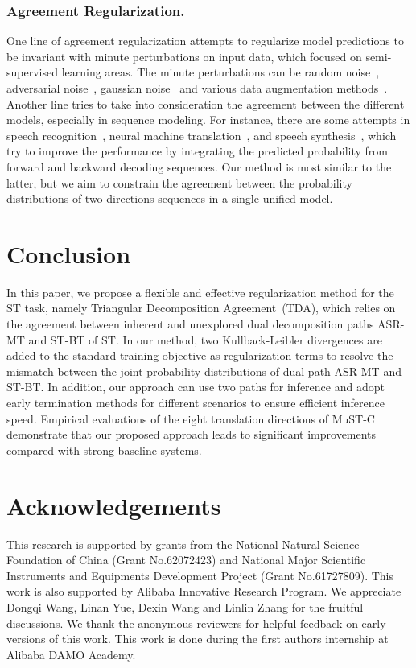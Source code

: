 \documentclass[letterpaper]{article} %
\begin{document}
\subsubsection*{Agreement Regularization.}
One line of agreement regularization attempts to regularize model predictions to be invariant with minute perturbations on input data, which focused on semi-supervised learning areas.
The minute perturbations can be random noise~\cite[]{Zheng2016ImprovingTR}, adversarial noise~\cite[]{Miyato2019VirtualAT,Carmon2019UnlabeledDI,Zhu2020FreeLBEA,Jiang2020SMARTRA}, gaussian noise~\cite[]{Aghajanyan2021BetterFB} and various data augmentation methods~\cite[]{Ye2019UnsupervisedEL,Xie2020UnsupervisedDA}. 
Another line tries to take into consideration the agreement between the different models, especially in sequence modeling. 
For instance, there are some attempts in speech recognition~\cite{Mimura2018ForwardBackwardAD}, neural machine translation~\cite[]{Liu2016AgreementOT,Zhang2019RegularizingNM}, and speech synthesis~\cite[]{Zheng2019ForwardBackwardDF}, which try to improve the performance by integrating the predicted probability from forward and backward decoding sequences. 
Our method is most similar to the latter, but we aim to constrain the agreement between the probability distributions of two directions sequences in a single unified model. 

\section{Conclusion}
In this paper, we propose a flexible and effective regularization method for the ST task, namely Triangular Decomposition Agreement~(TDA), which relies on the agreement between inherent and unexplored dual decomposition paths ASR-MT and ST-BT of ST. 
In our method, two Kullback-Leibler divergences are added to the standard training objective as regularization terms to resolve the mismatch between the joint probability distributions of dual-path ASR-MT and ST-BT. 
In addition, our approach can use two paths for inference and adopt early termination methods for different scenarios to ensure efficient inference speed. 
Empirical evaluations of the eight translation directions of MuST-C demonstrate that our proposed approach leads to significant improvements compared with strong baseline systems.

\section*{Acknowledgements}
This research is supported by grants from the National Natural Science Foundation of China (Grant No.62072423) and National Major Scientific Instruments and Equipments Development Project (Grant No.61727809). This work is also supported by Alibaba Innovative Research Program. We appreciate Dongqi Wang, Linan Yue, Dexin Wang and Linlin Zhang for the fruitful discussions. We thank the anonymous reviewers for helpful feedback on early versions of this work. This work is done during the first
authors internship at Alibaba DAMO Academy.


\end{document}

